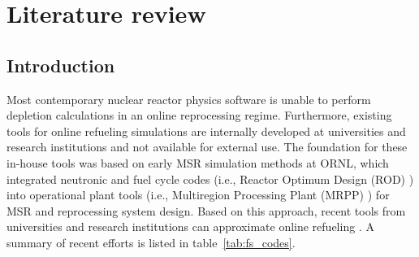 \chapter[Literature review]{Literature review}

\section{Introduction}
Most contemporary nuclear reactor physics software is 
unable to perform depletion calculations in an online 
reprocessing regime. Furthermore, existing tools for 
online refueling simulations are internally developed 
at universities and research institutions and not 
available for external use. The foundation for these in-house
tools was based on early \gls{MSR} simulation methods 
at \gls{ORNL}, which integrated neutronic and fuel 
cycle codes (i.e., Reactor Optimum Design (ROD) 
\cite{bauman_rod_1971}) into operational plant tools 
(i.e., Multiregion Processing Plant (MRPP) 
\cite{kee_mrpp_1976}) for \gls{MSR} and reprocessing 
system design. Based on this approach, recent tools 
from universities and research institutions can
approximate online refueling \cite{serp_molten_2014-1}. 
A summary of recent efforts is listed in table~\ref{tab:fs_codes}.
